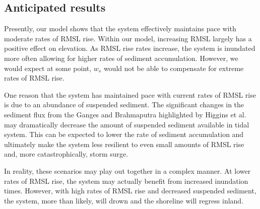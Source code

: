 \documentclass[12pt]{article}
\begin{document}
\subsection{Anticipated results}

Presently, our model shows that the system effectively maintains pace with moderate rates of RMSL rise. Within our model, increasing RMSL largely has a positive effect on elevation. As RMSL rise rates increase, the system is inundated more often allowing for higher rates of sediment accumulation. However, we would expect at some point, $w_s$ would not be able to compensate for extreme rates of RMSL rise.

One reason that the system has maintained pace with current rates of RMSL rise is due to an abundance of suspended sediment. The significant changes in the sediment flux from the Ganges and Brahmaputra highlighted by Higgins et al. \cite{higginsRiverLinkingIndia2018} may dramatically decrease the amount of suspended sediment available in tidal system. This can be expected to lower the rate of sediment accumulation and ultimately make the system less resilient to even small amounts of RMSL rise and, more catastrophically, storm surge.

In reality, these scenarios may play out together in a complex manner. At lower rates of RMSL rise, the system may actually benefit from increased inundation times. However, with high rates of RMSL rise and decreased suspended sediment, the system, more than likely, will drown and the shoreline will regress inland.



\end{document}
